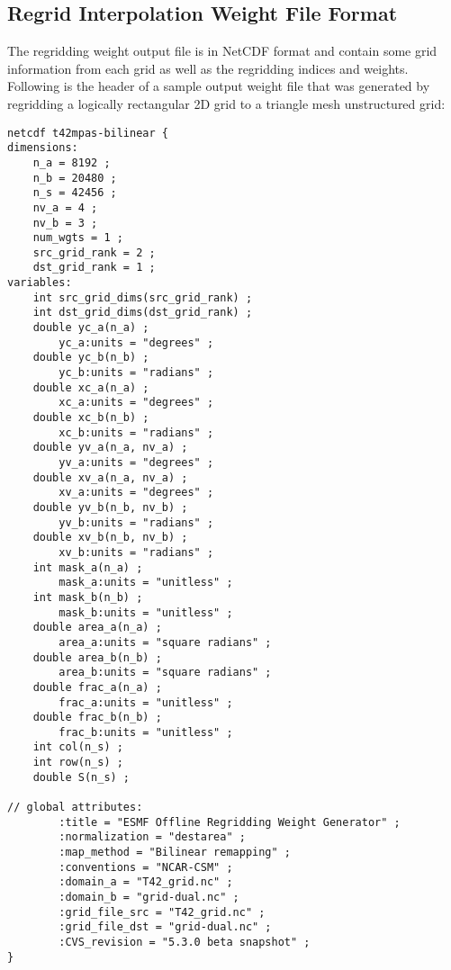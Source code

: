 \subsection{Regrid Interpolation Weight File Format}\label{sec:weightfileformat}

The regridding weight output file is in NetCDF format and contain some grid
information from each grid as well as the regridding indices and weights.
Following is the header of a sample output weight file that was generated by 
regridding a logically rectangular 2D grid to a triangle mesh unstructured grid:

\begin{verbatim}
netcdf t42mpas-bilinear {
dimensions:
	n_a = 8192 ;
	n_b = 20480 ;
	n_s = 42456 ;
	nv_a = 4 ;
	nv_b = 3 ;
	num_wgts = 1 ;
	src_grid_rank = 2 ;
	dst_grid_rank = 1 ;
variables:
	int src_grid_dims(src_grid_rank) ;
	int dst_grid_dims(dst_grid_rank) ;
	double yc_a(n_a) ;
		yc_a:units = "degrees" ;
	double yc_b(n_b) ;
		yc_b:units = "radians" ;
	double xc_a(n_a) ;
		xc_a:units = "degrees" ;
	double xc_b(n_b) ;
		xc_b:units = "radians" ;
	double yv_a(n_a, nv_a) ;
		yv_a:units = "degrees" ;
	double xv_a(n_a, nv_a) ;
		xv_a:units = "degrees" ;
	double yv_b(n_b, nv_b) ;
		yv_b:units = "radians" ;
	double xv_b(n_b, nv_b) ;
		xv_b:units = "radians" ;
	int mask_a(n_a) ;
		mask_a:units = "unitless" ;
	int mask_b(n_b) ;
		mask_b:units = "unitless" ;
	double area_a(n_a) ;
		area_a:units = "square radians" ;
	double area_b(n_b) ;
		area_b:units = "square radians" ;
	double frac_a(n_a) ;
		frac_a:units = "unitless" ;
	double frac_b(n_b) ;
		frac_b:units = "unitless" ;
	int col(n_s) ;
	int row(n_s) ;
	double S(n_s) ;

// global attributes:
		:title = "ESMF Offline Regridding Weight Generator" ;
		:normalization = "destarea" ;
		:map_method = "Bilinear remapping" ;
		:conventions = "NCAR-CSM" ;
		:domain_a = "T42_grid.nc" ;
		:domain_b = "grid-dual.nc" ;
		:grid_file_src = "T42_grid.nc" ;
		:grid_file_dst = "grid-dual.nc" ;
		:CVS_revision = "5.3.0 beta snapshot" ;
}
\end{verbatim}

